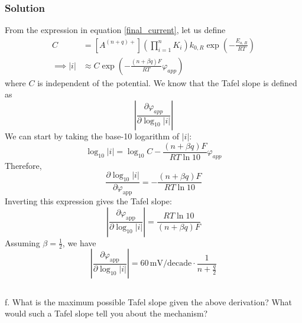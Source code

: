 \documentclass[12pt]{article}
\begin{document}
\subsubsection{Solution}
From the expression in equation \ref{final_current}, let us define
\begin{align}
C &= [A^{(n+q)+}] \left( \prod_{i=1}^{n} K_i \right) k_{0,R} \exp\left(-\frac{E_{a,R}}{RT}\right) \\
\implies |i| &\approx C \exp \left( -\frac{(n+\beta q) F}{RT} \varphi_{app} \right) \label{current_magnitude}
\end{align}
where $C$ is independent of the potential. We know that the Tafel slope is defined as
\begin{equation}
\left|\frac{\partial \varphi_{app}}{\partial \log_{10}|i|} \right|
\end{equation}
We can start by taking the base-10 logarithm of $|i|$:
\begin{equation}
\log_{10}|i| = \log_{10} C - \frac{(n+\beta q) F}{RT \ln 10} \varphi_{app}
\end{equation}
Therefore, 
\begin{equation}
\frac{\partial \log_{10}|i|}{\partial \varphi_{\text{app}}} = - \frac{(n+\beta q) F}{RT \ln 10}
\end{equation}
Inverting this expression gives the Tafel slope:
\begin{equation}
\left| \frac{\partial \varphi_{\text{app}}}{\partial \log_{10}|i|} \right| = \frac{RT \ln 10}{(n+\beta q) F}
\end{equation}
Assuming $\beta = \frac{1}{2}$, we have
\begin{equation}
\left| \frac{\partial \varphi_{\text{app}}}{\partial \log_{10}|i|} \right| = 60 \, \text{mV/decade} \cdot \frac{1}{n + \frac{q}{2}}
\end{equation}
\subsection{}
f. What is the maximum possible Tafel slope given the above derivation? What would such a Tafel slope tell you about the mechanism?\\
\end{document}
